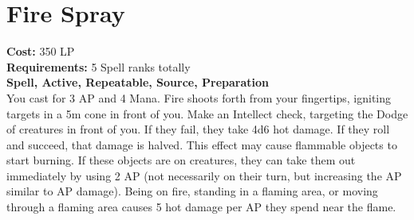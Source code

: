 \section{Fire Spray}\label{spell:fireSpray}
\textbf{Cost:} 350 LP\\
\textbf{Requirements:} 5 Spell ranks totally\\
\textbf{Spell, Active, Repeatable, Source, Preparation}\\
You cast for 3 AP and 4 Mana.
Fire shoots forth from your fingertips, igniting targets in a 5m cone in front of you.
Make an Intellect check, targeting the Dodge of creatures in front of you.
If they fail, they take 4d6 hot damage.
If they roll and succeed, that damage is halved.
This effect may cause flammable objects to start burning.
If these objects are on creatures, they can take them out immediately by using 2 AP (not necessarily on their turn, but increasing the AP similar to AP damage).
Being on fire, standing in a flaming area, or moving through a flaming area causes 5 hot damage per AP they spend near the flame.